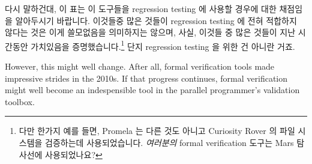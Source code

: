 다시 말하건대, 이 표는 이 도구들을 regression testing 에 사용할 경우에 대한
채점임을 알아두시기 바랍니다.
이것들중 많은 것들이 regression testing 에 전혀 적합하지 않다는 것은 이게
쓸모없음을 의미하지는 않으며, 사실, 이것들 중 많은 것들이 지난 시간동안
가치있음을 증명했습니다.\footnote{
	다만 한가지 예를 들면, Promela 는 다른 것도 아니고 Curiosity Rover 의
	파일 시스템을 검증하는데 사용되었습니다.
	\emph{여러분의} formal verification 도구는 Mars 탐사선에 사용되었나요?}
단지 regression testing 을 위한 건 아니란 거죠.
\iffalse

Once again, please note that this table rates these tools for use in
regression testing.
Just because many of them are poor fit for regression testing does
not at all mean that they are useless, in fact,
many of them have proven their worth many times over.\footnote{
	For but one example, Promela was used to verify the file system
	of none other than the Curiosity Rover.
	Was \emph{your} formal verification tool used on a Mars rover?}
Just not for regression testing.
\fi

However, this might well change.
After all, formal verification tools made impressive strides in the 2010s.
If that progress continues, formal verification might well become an
indespensible tool in the parallel programmer's validation toolbox.
